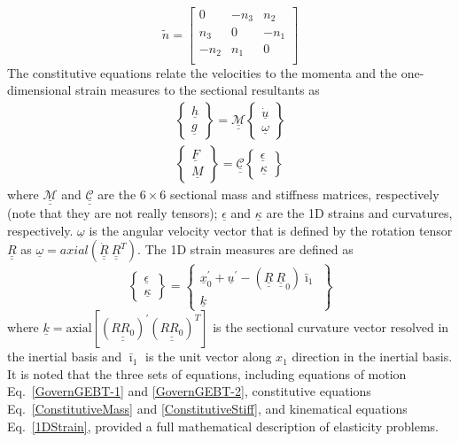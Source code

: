 \documentclass{aiaa-tc}
\newcommand{\tens}[1]{\underline{\underline{#1}}}
\renewcommand{\vec}[1]{\underline{#1}}
\renewcommand{\skew}[1]{\widetilde{#1}}
\begin{document}
\[
	\skew{n} = 
	     		\begin{bmatrix}
			0 & -n_3 & n_2 \\
			n_3 & 0 & -n_1 \\
			-n_2 & n_1 & 0\\
			\end{bmatrix}	
\]
The constitutive equations relate the velocities to the momenta and the one-dimensional strain measures to the sectional resultants as
\begin{align}
	\label{ConstitutiveMass}
	\begin{Bmatrix}
	\underline{h} \\
	\underline{g}
	\end{Bmatrix}
	= \underline{\underline{\mathcal{M}}} \begin{Bmatrix}
	\dot{\underline{u}} \\
	\underline{\omega}
	\end{Bmatrix} \\
	\label{ConstitutiveStiff}
	\begin{Bmatrix}
	\underline{F} \\
	\underline{M}
	\end{Bmatrix}
	= \underline{\underline{\mathcal{C}}} \begin{Bmatrix}
	\underline{\epsilon} \\
	\underline{\kappa}
	\end{Bmatrix}
\end{align}
where $\underline{\underline{\mathcal{M}}}$ and
$\underline{\underline{\mathcal{C}}}$ are the $6 \times 6$ sectional mass
and stiffness matrices, respectively (note that they are not really tensors);
$\underline{\epsilon}$ and $\underline{\kappa}$ are the 1D strains and
curvatures, respectively. $\underline{\omega}$ is the angular velocity
vector that is defined by the rotation tensor $\underline{\underline{R}}$ as
$\underline{\omega} =
axial(\dot{\underline{\underline{R}}}~\underline{\underline{R}}^T)$. The 1D
strain measures are defined as
\begin{equation}
    \label{1DStrain}
    \begin{Bmatrix}
        \vec{\epsilon} \\
        \vec{\kappa}
    \end{Bmatrix}
    =
    \begin{Bmatrix}
        \vec{x}^\prime_0 + \vec{u}^\prime - (\tens{R} ~\tens{R}_0) \bar{\imath}_1 \\
        \vec{k}
    \end{Bmatrix}
\end{equation}
where $\vec{k} = \text{axial} [(\tens{R R_0})^\prime (\tens{R R_0})^T]$ is the sectional
curvature vector resolved in the inertial basis and $\bar{\imath}_1$ is the unit
vector along $x_1$ direction in the inertial basis. It is noted that the
three sets of equations, including equations of motion
Eq.~\eqref{GovernGEBT-1} and \eqref{GovernGEBT-2}, constitutive equations
Eq.~\eqref{ConstitutiveMass} and \eqref{ConstitutiveStiff}, and kinematical
equations Eq.~\eqref{1DStrain}, provided a full mathematical description of elasticity problems. 
\end{document}
